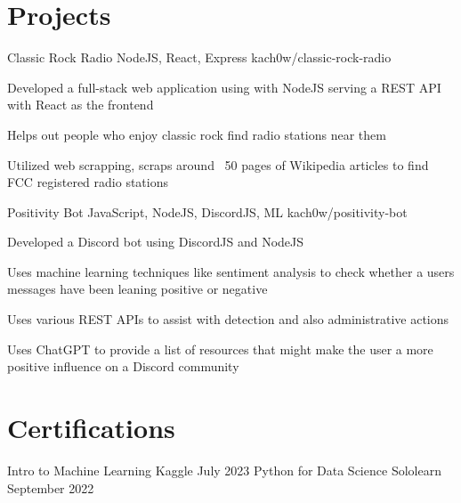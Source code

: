 \documentclass[letterpaper]{resume_config}
\begin{document}
\vspace{-10pt}

\section{Projects}

\Project
    {Classic Rock Radio} %
    {NodeJS, React, Express} %
    {kach0w/classic-rock-radio} %
    {
        \item Developed a full-stack web application using with NodeJS serving a REST API with React as the frontend
        \item Helps out people who enjoy classic rock find radio stations near them
        \item Utilized web scrapping, scraps around ~50 pages of Wikipedia articles to find FCC registered radio stations
    }

\Project
    {Positivity Bot} %
    {JavaScript, NodeJS, DiscordJS, ML} %
    {kach0w/positivity-bot} %
    {
        \item Developed a Discord bot using DiscordJS and NodeJS
        \item Uses machine learning techniques like sentiment analysis to check whether a users messages have been leaning positive or negative
        \item Uses various REST APIs to assist with detection and also administrative actions
        \item Uses ChatGPT to provide a list of resources that might make the user a more positive influence on a Discord community 
    }

\vspace{-8pt}

\section{Certifications}
\vspace{2pt}

\Certification
    {Intro to Machine Learning} %
    {Kaggle} %
    {July 2023} %
\Certification
    {Python for Data Science} %
    {Sololearn} %
    {September 2022} %
\vspace{-7pt}
\end{document}
